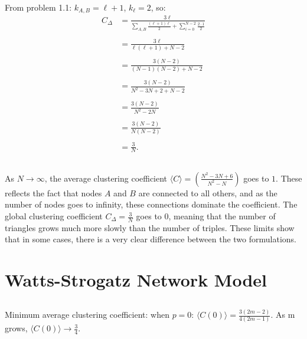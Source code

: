 \documentclass {article}
\begin{document}
From problem 1.1: $ k_{A, B} = \ell + 1$,    $k_{\ell} = 2 $, so:
\begin{align*}
 C_{\Delta} &=   \frac{ 3 \ell }{ \sum\limits_{ A,B} \frac{ (\ell + 1) \ell }{ 2 } + \sum\limits_{ i=0 }^{N-2} \frac{ 2 \cdot 1 }{ 2 }} \\ \\
& =\frac{ 3 \ell }{ \ell (\ell + 1) + N - 2 } \\ \\
& = \frac{ 3 (N - 2) }{ (N-1)(N-2) + N - 2 } \\ \\
& = \frac{ 3 (N - 2) }{ N^2 - 3N + 2 + N - 2 } \\ \\
& = \frac{ 3 (N - 2) }{ N^2 - 2N } \\ \\
& = \frac{ 3 (N - 2) }{ N (N - 2) } \\ \\
& = \frac{ 3 }{ N }.
\end{align*}

\subsection{}
As $ N \to \infty $, the average clustering coefficient $ \langle C \rangle = (\frac{ N^2 - 3N + 6 }{ N^2 - N }) $ goes to $ 1 $. These reflects the fact that nodes $ A $ and $ B $ are connected to all others, and as the number of nodes goes to infinity, these connections dominate the coefficient. The global clustering coefficient $ C_{\Delta} = \frac{ 3 }{ N } $ goes to 0, meaning that the number of triangles grows much more slowly than the number of triples. These limits show that in some cases, there is a very clear difference between the two formulations. 

\newpage



\section{Watts-Strogatz Network Model}

\subsection{}

Minimum average clustering coefficient: when $ p = 0 $: $ \langle C(0) \rangle = \frac{ 3(2m-2) }{ 4(2m-1) } $. As m grows, $ \langle C(0) \rangle \to \frac{ 3 }{ 4 } $.
\end{document}
